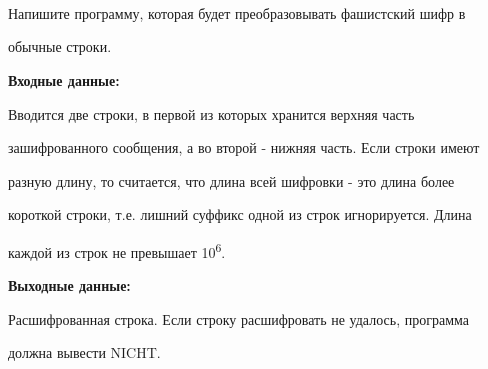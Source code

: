 \begin{question}
~



~



~



Напишите программу, которая будет преобразовывать фашистский шифр в

обычные строки.



\textbf{Входные данные:}



Вводится две строки, в первой из которых хранится верхняя часть

зашифрованного сообщения, а во второй - нижняя часть. Если строки имеют

разную длину, то считается, что длина всей шифровки - это длина более

короткой строки, т.е. лишний суффикс одной из строк игнорируется. Длина

каждой из строк не превышает 10\textsuperscript{6}.



\textbf{Выходные данные:}



Расшифрованная строка. Если строку расшифровать не удалось, программа

должна вывести NICHT.


\end{question}

